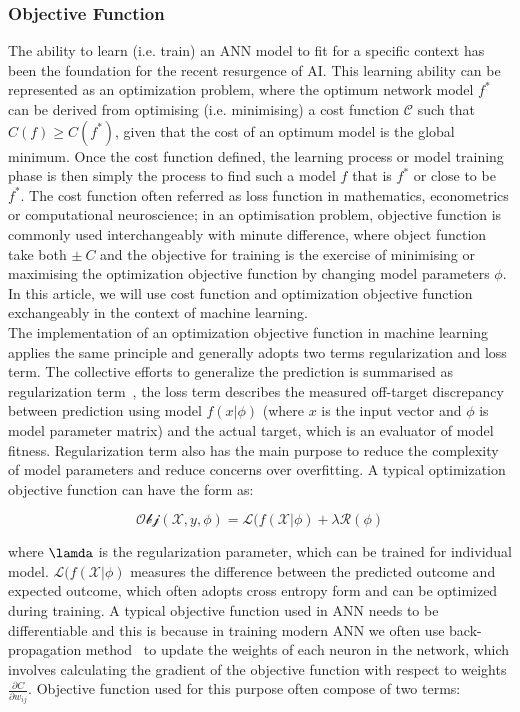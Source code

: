 \subsubsection{Objective Function}
The ability to learn (i.e. train) an ANN model to fit for a specific context has been the foundation for the recent resurgence of AI. This learning ability can be represented as an optimization problem, where the optimum network model $f^*$ can be derived from optimising (i.e. minimising) a cost function $\mathcal{C}$ such that $C(f) \geq C(f^*)$, given that the cost of an optimum model is the global minimum. Once the cost function defined, the learning process or model training phase is then simply the process to find such a model $f$ that is $f^*$ or close to be $f^*$. The cost function often referred as loss function in mathematics, econometrics or computational neuroscience; in an optimisation problem, objective function is commonly used interchangeably with minute difference, where object function take both $\pm~C$ and the objective for training is the exercise of minimising or maximising the optimization objective function by changing model parameters $\phi$. In this article, we will use cost function and optimization objective function exchangeably in the context of machine learning.
\\
The implementation of an optimization objective function in machine learning applies the same principle and generally adopts two terms regularization and loss term. The collective efforts to generalize the prediction is summarised as regularization term~\cite{goodfellow_2015}, the loss term describes the measured off-target discrepancy between prediction using model $f(x|\phi)$ (where $x$ is the input vector and $\phi$ is model parameter matrix) and the actual target, which is an evaluator of model fitness. Regularization term also has the main purpose to reduce the complexity of model parameters and reduce concerns over overfitting. A typical optimization objective function can have the form as:

\begin{equation}
    \mathcal{Obj}(\mathcal{X},y,\phi) = \mathcal{L}(f(\mathcal{X}|\phi) + \lambda \mathcal{R} (\phi) 
\end{equation}

where $\lamda$ is the regularization parameter, which can be trained for individual model. $\mathcal{L}(f(\mathcal{X}|\phi)$ measures the difference between the predicted outcome and expected outcome, which often adopts cross entropy form and can be optimized during training. A typical objective function used in ANN needs to be differentiable and this is because in training modern ANN we often use back-propagation method~\cite{LeCun_2015,Heaton_2017} to update the weights of each neuron in the network, which involves calculating the gradient of the objective function with respect to weights $\frac {\partial{C}} {\partial{w_{ij}}} $. Objective function used for this purpose often compose of two terms: 
